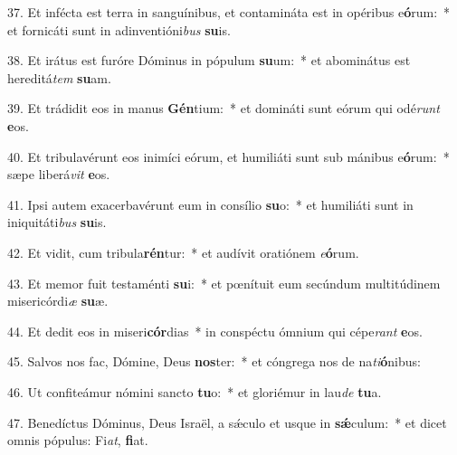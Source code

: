37. Et infécta est terra in sanguínibus, et contamináta est in opéribus e\textbf{ó}rum:~*  et fornicáti sunt in adinventióni\textit{bus} \textbf{su}is.\

38. Et irátus est furóre Dóminus in pópulum \textbf{su}um:~*  et abominátus est hereditá\textit{tem} \textbf{su}am.\

39. Et trádidit eos in manus \textbf{Gén}tium:~*  et domináti sunt eórum qui odé\textit{runt} \textbf{e}os.\

40. Et tribulavérunt eos inimíci eórum, et humiliáti sunt sub mánibus e\textbf{ó}rum:~*  sæpe liberá\textit{vit} \textbf{e}os.\

41. Ipsi autem exacerbavérunt eum in consílio \textbf{su}o:~*  et humiliáti sunt in iniquitáti\textit{bus} \textbf{su}is.\

42. Et vidit, cum tribula\textbf{rén}tur:~*  et audívit oratiónem \textit{e}\textbf{ó}rum.\

43. Et memor fuit testaménti \textbf{su}i:~*  et pœnítuit eum secúndum multitúdinem misericórdi\textit{æ} \textbf{su}æ.\

44. Et dedit eos in miseri\textbf{cór}dias~*  in conspéctu ómnium qui cépe\textit{rant} \textbf{e}os.\

45. Salvos nos fac, Dómine, Deus \textbf{nos}ter:~*  et cóngrega nos de na\textit{ti}\textbf{ó}nibus:\

46. Ut confiteámur nómini sancto \textbf{tu}o:~*  et gloriémur in lau\textit{de} \textbf{tu}a.\

47. Benedíctus Dóminus, Deus Israël, a sǽculo et usque in \textbf{sǽ}culum:~*  et dicet omnis pópulus: Fi\textit{at}, \textbf{fi}at.\

